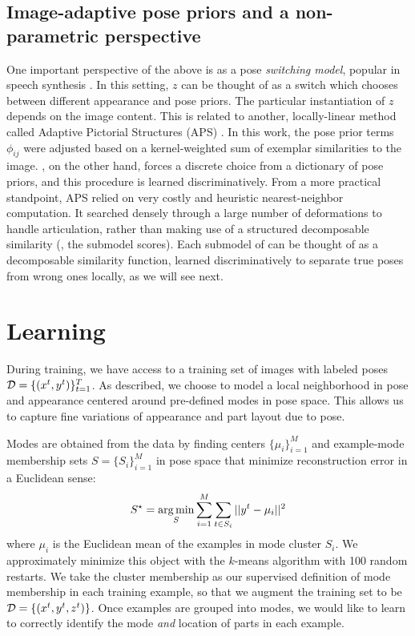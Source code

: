 \subsection{Image-adaptive pose priors and a non-parametric perspective}
One important perspective of the above is as a pose {\em switching model}, 
popular in speech synthesis \citep{rosti2003switching}.  In this setting, $z$ 
can be thought of as a switch which chooses between different appearance and 
pose priors.  The particular instantiation of $z$ depends on the image content.  
This is related to another, locally-linear method called Adaptive Pictorial 
Structures (APS) \citet{sapp2010}.  In this work, the pose prior terms 
$\phi_{ij}$ were adjusted based on a kernel-weighted sum of exemplar 
similarities to the image.  \LLPS, on the other hand, forces a discrete choice 
from a dictionary of pose priors, and this procedure is learned 
discriminatively.  From a more practical standpoint, APS relied on very costly 
and heuristic nearest-neighbor computation.  It searched densely through a 
large number of deformations to handle articulation, rather than making use of 
a structured decomposable similarity (\ie, the \LLPS submodel scores).  Each 
submodel of \LLPS can be thought of as a decomposable similarity function, 
learned discriminatively to separate true poses from wrong ones locally, as we 
will see next.

\section{Learning}\label{sec:llps-learning}

During training, we have access to a training set of images with labeled poses 
$\mathcal{D} = \{(x^{t},y^{t})\}_{t=1}^T$.  As described, we choose to model a local 
neighborhood in pose and appearance centered around pre-defined modes in pose 
space.  This allows us to capture fine variations of appearance and part layout
due to pose.

Modes are obtained from the data by finding centers $\{\mu_i \}_{i=1}^M$ and 
example-mode membership sets $S = \{S_i\}_{i=1}^M$ in pose space that minimize 
reconstruction error in a Euclidean sense:
\begin{align}
S^\star = \mathop{\arg\min}_{S} \sum_{i=1}^M \sum_{t \in S_i} ||y^{t} - \mu_i||^2
\end{align}
where $\mu_i$ is the Euclidean mean of the examples in mode cluster $S_i$.  We 
approximately minimize this object with the $k$-means algorithm with 100 random 
restarts.  We take the cluster membership as our supervised definition of mode 
membership in each training example, so that we augment the training set to be 
$\mathcal{D} = \{(x^t,y^t,z^t)\}$. Once examples are grouped into modes, we would like 
to learn to correctly identify the mode {\em and } location of parts in each 
example.  

